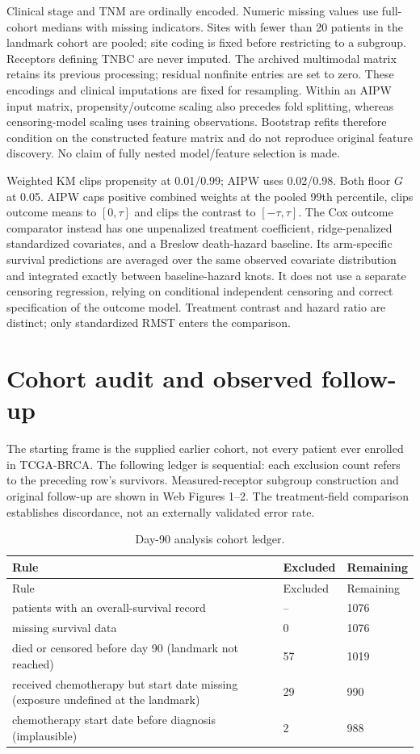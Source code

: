 \documentclass[12pt,letterpaper]{article}
\begin{document}
Clinical stage and TNM are ordinally encoded. Numeric missing values use full-cohort medians with
missing indicators. Sites with fewer than 20 patients in the landmark cohort are pooled; site coding is
fixed before restricting to a subgroup. Receptors defining TNBC are never imputed. The archived multimodal
matrix retains its previous processing; residual nonfinite entries are set to zero. These encodings and
clinical imputations are fixed for resampling. Within an AIPW input matrix, propensity/outcome scaling
also precedes fold splitting, whereas censoring-model scaling uses training observations. Bootstrap
refits therefore condition on the constructed feature matrix and do not reproduce original feature discovery.
No claim of fully nested model/feature selection is made.

Weighted KM clips propensity at 0.01/0.99; AIPW uses 0.02/0.98. Both floor $G$ at 0.05.
AIPW caps positive combined weights at the pooled 99th percentile, clips outcome means to $[0,\tau]$
and clips the contrast to $[-\tau,\tau]$. The Cox outcome comparator instead has one unpenalized treatment
coefficient, ridge-penalized standardized covariates, and a Breslow death-hazard baseline. Its arm-specific
survival predictions are averaged over the same observed covariate distribution and integrated exactly
between baseline-hazard knots. It does not use a separate censoring regression, relying on conditional
independent censoring and correct specification of the outcome model. Treatment contrast and hazard ratio
are distinct; only standardized RMST enters the comparison.

\section{Cohort audit and observed follow-up}
The starting frame is the supplied earlier cohort, not every patient ever enrolled in TCGA-BRCA.
The following ledger is sequential: each exclusion count refers to the preceding row's survivors.
Measured-receptor subgroup construction and original follow-up are shown in Web Figures 1--2.
The treatment-field comparison establishes discordance, not an externally validated error rate.

\begin{longtable}{p{4.3in}p{0.7in}p{0.8in}}
\caption{Day-90 analysis cohort ledger.}\\
\toprule
Rule & Excluded & Remaining \\
\midrule\endfirsthead
\toprule
Rule & Excluded & Remaining \\
\midrule\endhead
\bottomrule\endfoot
patients with an overall-survival record & -- & 1076 \\
missing survival data & 0 & 1076 \\
died or censored before day 90 (landmark not reached) & 57 & 1019 \\
received chemotherapy but start date missing (exposure undefined at the landmark) & 29 & 990 \\
chemotherapy start date before diagnosis (implausible) & 2 & 988 \\
\end{longtable}
\end{document}
